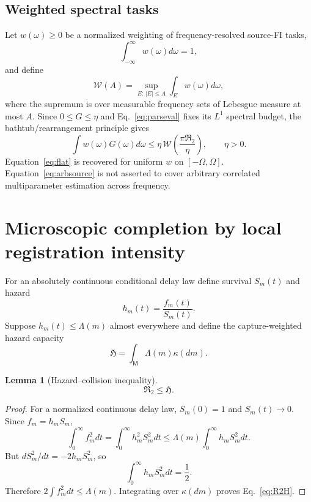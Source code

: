 \documentclass[aps,prapplied,preprint,nofootinbib]{revtex4-2}
\newtheorem{lemma}{Lemma}
\newcommand{\Wcal}{\mathcal W}
\newcommand{\Rtwo}{\mathfrak R_2}
\newcommand{\Hcap}{\mathfrak H}
\newcommand{\M}{\mathsf M}
\begin{document}
\subsection{Weighted spectral tasks}

Let $w(\omega)\ge0$ be a normalized weighting of frequency-resolved source-FI tasks,
\begin{equation}
\int_{-\infty}^{\infty}w(\omega)d\omega=1,
\end{equation}
and define
\begin{equation}
\Wcal(A)=\sup_{E:\,|E|\le A}\int_Ew(\omega)d\omega,
\label{eq:W}
\end{equation}
where the supremum is over measurable frequency sets of Lebesgue measure at most $A$. Since $0\le G\le\eta$ and Eq.~\eqref{eq:parseval} fixes its $L^1$ spectral budget, the bathtub/rearrangement principle gives
\begin{equation}
\boxed{
\int w(\omega)G(\omega)d\omega
\le\eta\,\Wcal\!\left(\frac{\pi\Rtwo}{\eta}\right),\qquad \eta>0.}
\label{eq:arbsource}
\end{equation}
Equation~\eqref{eq:flat} is recovered for uniform $w$ on $[-\Omega,\Omega]$. Equation~\eqref{eq:arbsource} is not asserted to cover arbitrary correlated multiparameter estimation across frequency.

\section{Microscopic completion by local registration intensity}

For an absolutely continuous conditional delay law define survival $S_m(t)$ and hazard
\begin{equation}
h_m(t)=\frac{f_m(t)}{S_m(t)}.
\end{equation}
Suppose $h_m(t)\le\Lambda(m)$ almost everywhere and define the capture-weighted hazard capacity
\begin{equation}
\boxed{\Hcap=\int_{\M}\Lambda(m)\kappa(dm).}
\label{eq:Hcap}
\end{equation}

\begin{lemma}[Hazard--collision inequality]
\begin{equation}
\boxed{\Rtwo\le\Hcap.}
\label{eq:R2H}
\end{equation}
\end{lemma}

\begin{proof}
For a normalized continuous delay law, $S_m(0)=1$ and $S_m(t)\to0$. Since $f_m=h_mS_m$,
\begin{equation}
\int_0^\infty f_m^2dt
=\int_0^\infty h_m^2S_m^2dt
\le\Lambda(m)\int_0^\infty h_mS_m^2dt.
\end{equation}
But $dS_m^2/dt=-2h_mS_m^2$, so
\begin{equation}
\int_0^\infty h_mS_m^2dt=\frac12.
\end{equation}
Therefore $2\int f_m^2dt\le\Lambda(m)$. Integrating over $\kappa(dm)$ proves Eq.~\eqref{eq:R2H}.
\end{proof}
\end{document}
